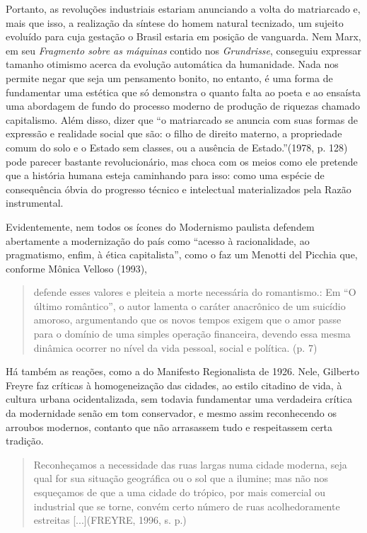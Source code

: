 Portanto, as revoluções industriais estariam anunciando a volta do
matriarcado e, mais que isso, a realização da síntese do homem natural
tecnizado, um sujeito evoluído para cuja gestação o Brasil estaria em
posição de vanguarda. Nem Marx, em seu \emph{Fragmento sobre as
máquinas} contido nos \emph{Grundrisse}, conseguiu expressar tamanho
otimismo acerca da evolução automática da humanidade. Nada nos permite
negar que seja um pensamento bonito, no entanto, é uma forma de
fundamentar uma estética que só demonstra o quanto falta ao poeta e ao
ensaísta uma abordagem de fundo do processo moderno de produção de
riquezas chamado capitalismo. Além disso, dizer que ``o matriarcado se
anuncia com suas formas de expressão e realidade social que são: o filho
de direito materno, a propriedade comum do solo e o Estado sem classes,
ou a ausência de Estado.''(1978, p. 128) pode parecer bastante
revolucionário, mas choca com os meios como ele pretende que a história
humana esteja caminhando para isso: como uma espécie de consequência
óbvia do progresso técnico e intelectual materializados pela Razão
instrumental.

Evidentemente, nem todos os ícones do Modernismo paulista defendem
abertamente a modernização do país como ``acesso à racionalidade, ao
pragmatismo, enfim, à ética capitalista'', como o faz um Menotti del
Picchia que, conforme Mônica Velloso (1993),

\begin{quote}
defende esses valores e pleiteia a morte necessária do romantismo.: Em
``O último romântico'', o autor lamenta o caráter anacrônico de um
suicídio amoroso, argumentando que os novos tempos exigem que o amor
passe para o domínio de uma simples operação financeira, devendo essa
mesma dinâmica ocorrer no nível da vida pessoal, social e política. (p.
7)
\end{quote}

Há também as reações, como a do Manifesto Regionalista de 1926. Nele,
Gilberto Freyre faz críticas à homogeneização das cidades, ao estilo
citadino de vida, à cultura urbana ocidentalizada, sem todavia
fundamentar uma verdadeira crítica da modernidade senão em tom
conservador, e mesmo assim reconhecendo os arroubos modernos, contanto
que não arrasassem tudo e respeitassem certa tradição.

\begin{quote}
Reconheçamos a necessidade das ruas largas numa cidade moderna, seja
qual for sua situação geográfica ou o sol que a ilumine; mas não nos
esqueçamos de que a uma cidade do trópico, por mais comercial ou
industrial que se torne, convém certo número de ruas acolhedoramente
estreitas {[}...{]}(FREYRE, 1996, s. p.)
\end{quote}

